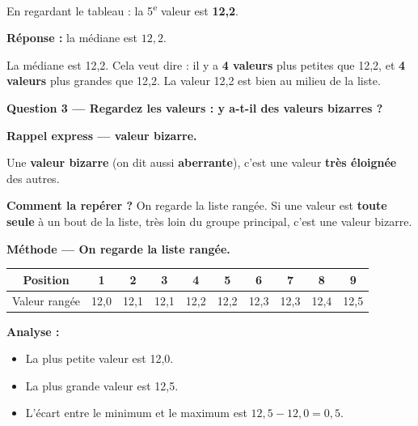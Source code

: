 \documentclass[12pt,a4paper]{article}
\begin{document}
En regardant le tableau : la 5\textsuperscript{e} valeur est \textbf{12,2}.

\vspace{0.3cm}
\textbf{Réponse :} la médiane est $\boxed{12{,}2}$.

\begin{enclair}
La médiane est 12,2. Cela veut dire : il y a \textbf{4 valeurs} plus petites que 12,2, et \textbf{4 valeurs} plus grandes que 12,2. La valeur 12,2 est bien au milieu de la liste.
\end{enclair}

\vspace{0.5cm}

\begin{correctionbox}
\textbf{Question 3 — Regardez les valeurs : y a-t-il des valeurs bizarres ?}
\end{correctionbox}

\begin{rappelcible}
\textbf{Rappel express — valeur bizarre.}

\vspace{0.2cm}
Une \textbf{valeur bizarre} (on dit aussi \textbf{aberrante}), c'est une valeur \textbf{très éloignée} des autres.

\vspace{0.2cm}
\textbf{Comment la repérer ?} On regarde la liste rangée. Si une valeur est \textbf{toute seule} à un bout de la liste, très loin du groupe principal, c'est une valeur bizarre.
\end{rappelcible}

\vspace{0.3cm}
\textbf{Méthode — On regarde la liste rangée.}

\begin{center}
\begin{tabular}{|c|c|c|c|c|c|c|c|c|c|}
\hline
Position & 1 & 2 & 3 & 4 & 5 & 6 & 7 & 8 & 9 \\
\hline
Valeur rangée & 12,0 & 12,1 & 12,1 & 12,2 & 12,2 & 12,3 & 12,3 & 12,4 & 12,5 \\
\hline
\end{tabular}
\end{center}

\textbf{Analyse :}
\begin{itemize}[leftmargin=*]
  \item La plus petite valeur est 12,0.
  \item La plus grande valeur est 12,5.
  \item L'écart entre le minimum et le maximum est $12{,}5 - 12{,}0 = 0{,}5$.
\end{itemize}
\end{document}
